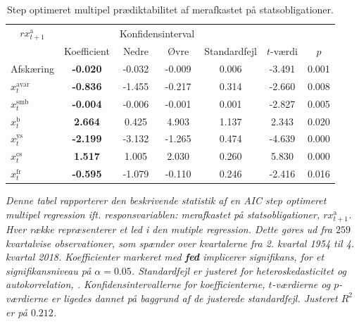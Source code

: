 \documentclass[
  a4paper,
  oneside]{memoir}
\begin{document}
\begin{table}[H]

\caption{\label{tab:MULT-step-s}Step optimeret multipel prædiktabilitet af merafkastet på statsobligationer.}
\centering
\begin{threeparttable}
\begin{tabular}[t]{lcccccc}
\toprule
\multicolumn{1}{c}{$rx_{t+1}^{\text{a}}$} & \multicolumn{1}{c}{ } & \multicolumn{2}{c}{Konfidensinterval} & \multicolumn{3}{c}{ } \\
\cmidrule(l{3pt}r{3pt}){1-1} \cmidrule(l{3pt}r{3pt}){3-4}
  & Koefficient & Nedre & Øvre & Standardfejl & $t$-værdi & $p$\\
\midrule
\rowcolor{gray!6}  Afskæring & \textbf{-0.020} & -0.032 & -0.009 & 0.006 & -3.491 & 0.001\\
$x_t^{\text{avar}}$ & \textbf{-0.836} & -1.455 & -0.217 & 0.314 & -2.660 & 0.008\\
\rowcolor{gray!6}  $x_t^{\text{smb}}$ & \textbf{-0.004} & -0.006 & -0.001 & 0.001 & -2.827 & 0.005\\
$x_t^{\text{b}}$ & \textbf{ 2.664} & 0.425 & 4.903 & 1.137 & 2.343 & 0.020\\
\rowcolor{gray!6}  $x_t^{\text{ys}}$ & \textbf{-2.199} & -3.132 & -1.265 & 0.474 & -4.639 & 0.000\\
$x_t^{\text{cs}}$ & \textbf{ 1.517} & 1.005 & 2.030 & 0.260 & 5.830 & 0.000\\
\rowcolor{gray!6}  $x_t^{\text{fr}}$ & \textbf{-0.595} & -1.079 & -0.110 & 0.246 & -2.416 & 0.016\\
\bottomrule
\end{tabular}
\begin{tablenotes}
\item \textit{Denne tabel rapporterer den beskrivende statistik af en AIC step optimeret multipel regression ift. responsvariablen: merafkastet på statsobligationer, $rx_{t+1}^{\text{a}}$. Hver række repræsenterer et led i den mutiple regression. Dette gøres ud fra $259$ kvartalvise observationer, som spænder over kvartalerne fra 2. kvartal 1954 til 4. kvartal 2018. Koefficienter markeret med \textbf{fed} implicerer signifikans, for et signifikansniveau på $\alpha=0.05$. Standardfejl er justeret for heteroskedasticitet og autokorrelation, \citep{Newey1987}. Konfidensintervallerne for koefficienterne, $t$-værdierne og $p$-værdierne er ligedes dannet på baggrund af de justerede standardfejl. Justeret $R^2$ er på $0.212$.}
\end{tablenotes}
\end{threeparttable}
\end{table}
\end{document}
